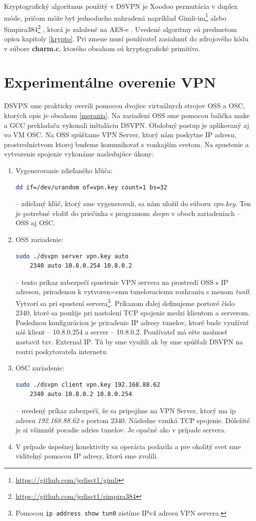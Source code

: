Kryptografický algoritmus použitý v DSVPN je Xoodoo permutácia v duplex móde, pričom môže byť jednoducho nahradená napríklad Gimli-im\footnote{\url{https://github.com/jedisct1/gimli}} \cite{gimli} alebo Simpira384\footnote{\url{https://github.com/jedisct1/simpira384}} \cite{simpira}, ktorá je založené na AES-e . Uvedené algoritmy sú predmetom opisu kapitoly \ref{krypto}. Pri zmene musí používateľ zasiahnuť do zdrojového kódu v súbore \textbf{charm.c}, ktorého obsahom sú kryptografické primitíva.     
\section{Experimentálne overenie VPN}
DSVPN sme prakticky overili pomocou dvojice virtuálnych strojov OSS a OSC, ktorých opis je obsahom \ref{merania}. Na zariadení OSS sme pomocou balička make a GCC prekladača vykonali inštaláciu DSVPN. Obdobný postup je aplikovaný aj vo VM OSC. Na OSS spúšťame VPN Server, ktorý nám poskytne IP adresu, prostredníctvom ktorej budeme komunikovať s vonkajším svetom. Na spustenie a vytvorenie spojenie vykonáme nasledujúce úkony:
\begin{enumerate}
	\item Vygenerovanie zdieľaného kľúča:\begin{lstlisting}[language=bash]
		dd if=/dev/urandom of=vpn.key count=1 bs=32
	\end{lstlisting} 
-- zdieľaný kľúč, ktorý sme vygenerovali, sa nám uložil do súboru \textit{vpn.key}. Ten je potrebné vložiť do priečinka s programom \textit{dsvpn} v oboch zariadeniach -- OSS aj OSC. 
	\item OSS zariadenie: \begin{lstlisting}[language=bash] 
	sudo ./dsvpn server vpn.key auto 
	2340 auto 10.8.0.254 10.8.0.2
	\end{lstlisting} 
-- tento príkaz zabezpečí spustenie VPN servera na prostredí OSS s IP adresou, priradenou k vytvoren=emu tunelovaciemu rozhraniu s menom \textit{tun0}. Vytvorí sa pri spustení servera\footnote{Pomocou \lstinline|ip address show tun0| zistíme IPv4 adresu VPN servera.}. Príkazom ďalej definujeme portové číslo 2340, ktoré sa použije pri nastolení TCP spojenie medzi klientom a serverom. Poslednou konfiguráciou je priradenie IP adresy tunelov, ktoré bude využívať náš klient -- 10.8.0.254 a server -- 10.8.0.2. Používateľ má ešte možnosť nastaviť tzv. External IP. Tú by sme využili ak by sme spúšťali DSVPN na routri poskytovateľa internetu.  
	\item OSC zariadenie: \begin{lstlisting}[language=bash] 
	sudo ./dsvpn client vpn.key 192.168.88.62 
	2340 auto 10.8.0.2 10.8.0.254
	\end{lstlisting} 
-- uvedený príkaz zabezpečí, že sa pripojíme na VPN Server, ktorý ma ip adresu \textit{192.168.88.62} s portom 2340. Následne vzniká TCP spojenie. Dôležité je si všimnúť poradie adries tunelov. Je opačné ako v prípade servera. 
	\item V prípade úspešnej konektivity sa operácia podarila a pre okolitý svet sme viditelný pomocou IP adresy, ktorú sme zvolili. 
\end{enumerate}

